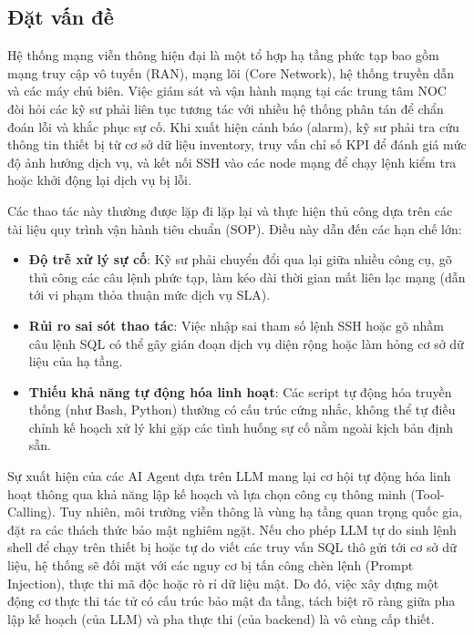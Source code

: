 \documentclass[12pt,a4paper]{article}
\begin{document}
\subsection{Đặt vấn đề}
Hệ thống mạng viễn thông hiện đại là một tổ hợp hạ tầng phức tạp bao gồm mạng truy cập vô tuyến (RAN), mạng lõi (Core Network), hệ thống truyền dẫn và các máy chủ biên. Việc giám sát và vận hành mạng tại các trung tâm NOC đòi hỏi các kỹ sư phải liên tục tương tác với nhiều hệ thống phân tán để chẩn đoán lỗi và khắc phục sự cố. Khi xuất hiện cảnh báo (alarm), kỹ sư phải tra cứu thông tin thiết bị từ cơ sở dữ liệu inventory, truy vấn chỉ số KPI để đánh giá mức độ ảnh hưởng dịch vụ, và kết nối SSH vào các node mạng để chạy lệnh kiểm tra hoặc khởi động lại dịch vụ bị lỗi.

Các thao tác này thường được lặp đi lặp lại và thực hiện thủ công dựa trên các tài liệu quy trình vận hành tiêu chuẩn (SOP). Điều này dẫn đến các hạn chế lớn:
\begin{itemize}
    \item \textbf{Độ trễ xử lý sự cố}: Kỹ sư phải chuyển đổi qua lại giữa nhiều công cụ, gõ thủ công các câu lệnh phức tạp, làm kéo dài thời gian mất liên lạc mạng (dẫn tới vi phạm thỏa thuận mức dịch vụ SLA).
    \item \textbf{Rủi ro sai sót thao tác}: Việc nhập sai tham số lệnh SSH hoặc gõ nhầm câu lệnh SQL có thể gây gián đoạn dịch vụ diện rộng hoặc làm hỏng cơ sở dữ liệu của hạ tầng.
    \item \textbf{Thiếu khả năng tự động hóa linh hoạt}: Các script tự động hóa truyền thống (như Bash, Python) thường có cấu trúc cứng nhắc, không thể tự điều chỉnh kế hoạch xử lý khi gặp các tình huống sự cố nằm ngoài kịch bản định sẵn.
\end{itemize}

Sự xuất hiện của các AI Agent dựa trên LLM mang lại cơ hội tự động hóa linh hoạt thông qua khả năng lập kế hoạch và lựa chọn công cụ thông minh (Tool-Calling). Tuy nhiên, môi trường viễn thông là vùng hạ tầng quan trọng quốc gia, đặt ra các thách thức bảo mật nghiêm ngặt. Nếu cho phép LLM tự do sinh lệnh shell để chạy trên thiết bị hoặc tự do viết các truy vấn SQL thô gửi tới cơ sở dữ liệu, hệ thống sẽ đối mặt với các nguy cơ bị tấn công chèn lệnh (Prompt Injection), thực thi mã độc hoặc rò rỉ dữ liệu mật. Do đó, việc xây dựng một động cơ thực thi tác tử có cấu trúc bảo mật đa tầng, tách biệt rõ ràng giữa pha lập kế hoạch (của LLM) và pha thực thi (của backend) là vô cùng cấp thiết.
\end{document}
